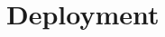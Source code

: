 \documentclass[]{article}
\begin{document}
        \section{Deployment}



















\end{document}
